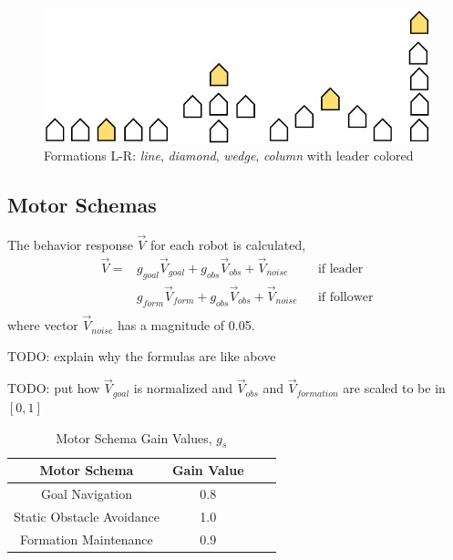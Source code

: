 \documentclass[letterpaper, 10 pt, conference]{ieeeconf}  %
\begin{document}
\begin{figure}[thpb]
\centering
\includegraphics[width=0.7\linewidth]{images/formation_shapes.jpg}
\caption{Formations L-R: \textit{line}, \textit{diamond}, \textit{wedge}, \textit{column} with leader colored}
\label{formation_shapes}
\end{figure}

\subsection{Motor Schemas}

The behavior response $\vec{V}$ for each robot is calculated,
\begin{equation*}
\begin{aligned}
\vec{V} = & g_{goal} \vec{V}_{goal} + g_{obs} \vec{V}_{obs} + \vec{V}_{noise}        && \text{if leader}\\
              & g_{form} \vec{V}_{form} + g_{obs} \vec{V}_{obs} + \vec{V}_{noise}       && \text{if follower}\\
\end{aligned}
\end{equation*}
where vector $\vec{V}_{noise}$ has a magnitude of 0.05.

TODO: explain why the formulas are like above

TODO: put how $\vec{V}_{goal}$ is normalized and $\vec{V}_{obs}$ and $\vec{V}_{formation}$ are scaled to be in $[0,1]$

\begin{table}[h]
\begin{center}
\begin{tabular}{|c|c|c c|}
\hline
Motor Schema & Gain Value \\
\hline
Goal Navigation                & 0.8 \\
Static Obstacle Avoidance   & 1.0 \\
Formation Maintenance      & 0.9 \\
\hline
\end{tabular}
\end{center}
\caption{Motor Schema Gain Values, $g_s$}
\label{table_example}
\end{table}
\end{document}
